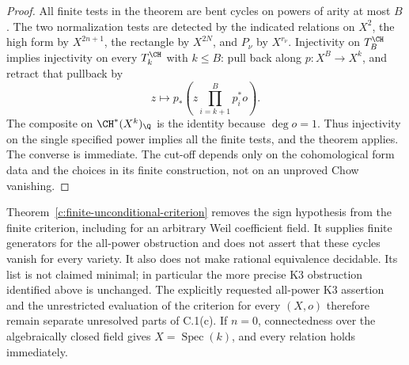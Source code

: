 \begin{proof}
All finite tests in the theorem are bent cycles on powers of
arity at most $B$.  The two normalization tests are detected by
the indicated relations on $X^2$, the high form by $X^{2n+1}$,
the rectangle by $X^{2N}$, and $P_\nu$ by $X^{r_\nu}$.
Injectivity on $T_B^{\CH}$ implies injectivity on every
$T_k^{\CH}$ with $k\leq B$: pull back along $p:X^B\to X^k$,
and retract that pullback by
\[
 z\longmapsto p_*\left(z\prod_{i=k+1}^{B}p_i^*o\right).
\]
The composite on $\CH^*(X^k)_\Q$ is the identity because
$\deg o=1$.  Thus injectivity on the single specified power
implies all the finite tests, and the theorem applies.  The
converse is immediate.  The cut-off depends only on the
cohomological form data and the choices in its finite
construction, not on an unproved Chow vanishing.
\end{proof}

\begin{remark}
\label{c:finite-unconditional-scope}
Theorem~\ref{c:finite-unconditional-criterion} removes the sign
hypothesis from the finite criterion, including for an arbitrary
Weil coefficient field.  It supplies finite generators for the
all-power obstruction and does not assert that these cycles
vanish for every variety.  It also does not make rational
equivalence decidable.  Its list is not claimed minimal; in
particular the more precise K3 obstruction identified above is
unchanged.  The explicitly requested all-power K3 assertion and
the unrestricted evaluation of the criterion for every $(X,o)$
therefore remain separate unresolved parts of C.1(c).
If $n=0$, connectedness over the algebraically closed field gives
$X=\operatorname{Spec}(k)$, and every relation holds immediately.
\end{remark}
